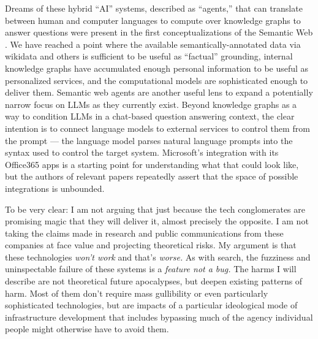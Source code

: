 Dreams of these hybrid ``AI'' systems, described as ``agents,'' that can
translate between human and computer languages to compute over knowledge
graphs to answer questions were present in the first conceptualizations
of the Semantic Web \cite{berners-leeSemanticWeb2001} . We have reached a point where the
available semantically-annotated data via wikidata and others is
sufficient to be useful as ``factual'' grounding, internal knowledge
graphs have accumulated enough personal information to be useful as
personalized services, and the computational models are sophisticated
enough to deliver them. Semantic web agents are another useful lens to
expand a potentially narrow focus on LLMs as they currently exist.
Beyond knowledge graphs as a way to condition LLMs in a chat-based
question answering context, the clear intention is to connect language
models to external services to control them from the prompt \cite{bubeckSparksArtificialGeneral2023}  --- the language model parses
natural language prompts into the syntax used to control the target
system. Microsoft's integration with its Office365 apps is a starting
point for understanding what that could look like, but the authors of
relevant papers repeatedly assert that the space of possible
integrations is unbounded.

To be very clear: I am not arguing that just because the tech
conglomerates are promising magic that they will deliver it, almost
precisely the opposite. I am not taking the claims made in research and
public communications from these companies at face value and projecting
theoretical risks. My argument is that these
technologies \emph{won't work} and that's \emph{worse.} As with search,
the fuzziness and uninspectable failure of these systems is a
\emph{feature not a bug.} The harms I will describe are not theoretical
future apocalypses, but deepen existing patterns of harm. Most of them
don't require mass gullibility or even particularly sophisticated
technologies, but are impacts of a particular ideological mode of
infrastructure development that includes bypassing much of the agency
individual people might otherwise have to avoid them.

